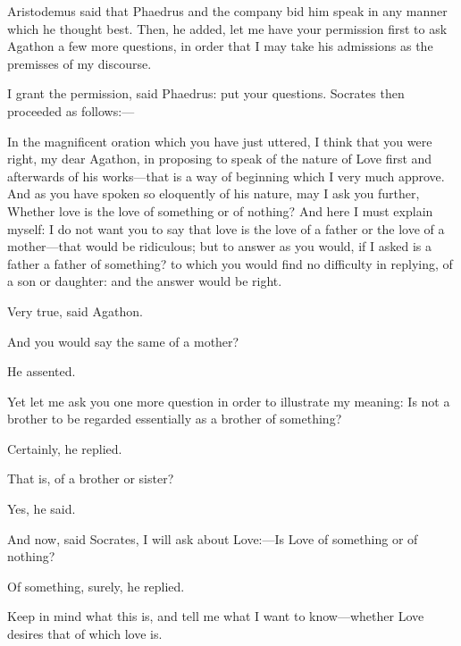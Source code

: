 \documentclass[11pt,letter]{article}
\begin{document}
\par  Aristodemus said that Phaedrus and the company bid him speak in any manner which he thought best. Then, he added, let me have your permission first to ask Agathon a few more questions, in order that I may take his admissions as the premisses of my discourse.

\par  I grant the permission, said Phaedrus: put your questions. Socrates then proceeded as follows:—

\par  In the magnificent oration which you have just uttered, I think that you were right, my dear Agathon, in proposing to speak of the nature of Love first and afterwards of his works—that is a way of beginning which I very much approve. And as you have spoken so eloquently of his nature, may I ask you further, Whether love is the love of something or of nothing? And here I must explain myself: I do not want you to say that love is the love of a father or the love of a mother—that would be ridiculous; but to answer as you would, if I asked is a father a father of something? to which you would find no difficulty in replying, of a son or daughter: and the answer would be right.

\par  Very true, said Agathon.

\par  And you would say the same of a mother?

\par  He assented.

\par  Yet let me ask you one more question in order to illustrate my meaning: Is not a brother to be regarded essentially as a brother of something?

\par  Certainly, he replied.

\par  That is, of a brother or sister?

\par  Yes, he said.

\par  And now, said Socrates, I will ask about Love:—Is Love of something or of nothing?

\par  Of something, surely, he replied.

\par  Keep in mind what this is, and tell me what I want to know—whether Love desires that of which love is.
\end{document}
